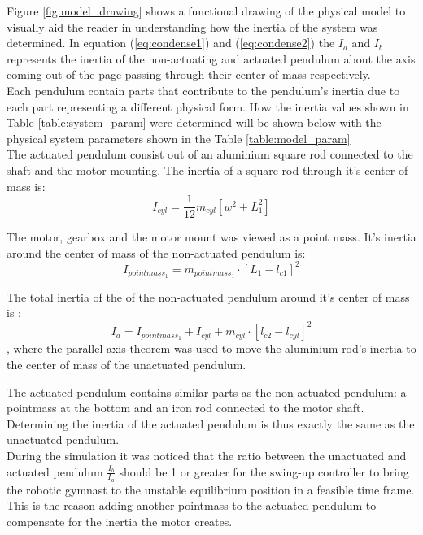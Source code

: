 Figure \ref{fig:model_drawing} shows a functional drawing of the physical model to visually aid the reader in understanding how the inertia of the system was determined. In equation (\ref{eq:condense1}) and (\ref{eq:condense2}) the $I_{a}$ and $I_{b}$ represents the inertia of the non-actuating and actuated pendulum about the axis coming out of the page passing through their center of mass respectively.\\

Each pendulum contain parts that contribute to the pendulum's inertia due to each part representing a different physical form. How the inertia values shown in Table \ref{table:system_param} were determined will be shown below with the physical system parameters shown in the Table \ref{table:model_param}\\

The actuated pendulum consist out of an aluminium square rod connected to the shaft and the motor mounting. The inertia of a square rod through it's center of mass is: $$ I_{cyl} = \frac{1}{12}m_{cyl}[w^2+L^2_{1}]$$

The motor, gearbox and the motor mount was viewed as a point mass. It's inertia around the center of mass of the non-actuated pendulum is: $$I_{pointmass_1} = m_{pointmass_1}\cdot[L_{1}-l_{c1}]^2 $$

The total inertia of the of the non-actuated pendulum around it's center of mass is : $$ I_{a} =I_{pointmass_1} +  I_{cyl} + m_{cyl}\cdot[l_{c2}-l_{cyl}]^2 $$, where the parallel axis theorem was used to move the aluminium rod's inertia to the center of mass of the unactuated pendulum.

The actuated pendulum contains similar parts as the non-actuated pendulum: a pointmass at the bottom and an iron rod connected to the motor shaft. Determining the inertia of the actuated pendulum is thus exactly the same as the unactuated pendulum.\\

During the simulation it was noticed that the ratio between the unactuated and actuated pendulum $\frac{I_{b}}{I_{a}}$ should be 1 or greater for the swing-up controller to bring the robotic gymnast to the unstable equilibrium position in a feasible time frame. This is the reason adding another pointmass to the actuated pendulum to compensate for the inertia the motor creates.


